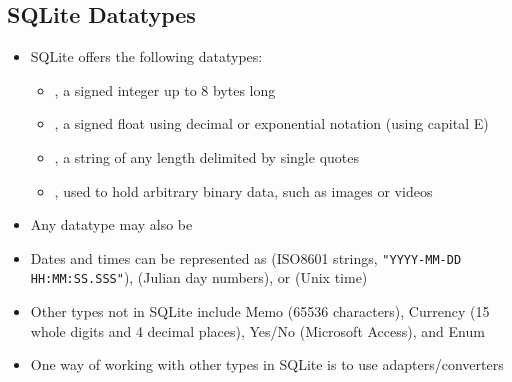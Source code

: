 \documentclass[a4paper]{article}
\begin{document}
\subsection{SQLite Datatypes}
\begin{itemize}
    \item SQLite offers the following datatypes:
    \begin{itemize}
        \item {}, a signed integer up to 8 bytes long
        \item {}, a signed float using decimal or exponential notation (using capital E)
        \item {}, a string of any length delimited by single quotes
        \item {}, used to hold arbitrary binary data, such as images or videos
    \end{itemize}
    \item Any datatype may also be 
    \item Dates and times can be represented as  (ISO8601 strings, \texttt{"YYYY-MM-DD HH:MM:SS.SSS"}),  (Julian day numbers), or  (Unix time)
    \item Other types not in SQLite include Memo (65536 characters), Currency (15 whole digits and 4 decimal places), Yes/No (Microsoft Access), and Enum
    \item One way of working with other types in SQLite is to use adapters/converters
    \begin{arrows}

\end{arrows}
\end{itemize}
\end{document}
